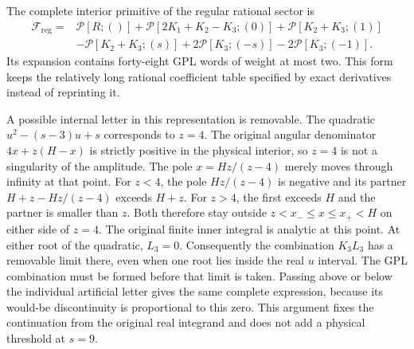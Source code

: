 The complete interior primitive of the regular rational sector is
\begin{align}
 \mathcal F_{\mathrm{reg}}={}&\mathcal P[R;()]
 +\mathcal P[2K_1+K_2-K_3;(0)]
 +\mathcal P[K_2+K_3;(1)]\\
 &-\mathcal P[K_2+K_3;(s)]
 +2\mathcal P[K_3;(-s)]-2\mathcal P[K_3;(-1)].
 \label{eq:comp-real-rational-primitive}
\end{align}
Its expansion contains forty-eight GPL words of weight at most two.
This form keeps the relatively long rational coefficient table
specified by exact derivatives instead of reprinting it.

A possible internal letter in this representation is removable.
The quadratic $u^2-(s-3)u+s$ corresponds to $z=4$. The original
angular denominator $4x+z(H-x)$ is strictly positive in the physical
interior, so $z=4$ is not a singularity of the amplitude. The pole
$x=Hz/(z-4)$ merely moves through infinity at that point.
For $z<4$, the pole $Hz/(z-4)$ is negative and its partner
$H+z-Hz/(z-4)$ exceeds $H+z$. For $z>4$, the first exceeds
$H$ and the partner is smaller than $z$. Both therefore stay outside
$z<x_-\leq x\leq x_+<H$ on either side of $z=4$.
The original finite inner integral is analytic at this point.
At either root of the quadratic, $L_3=0$. Consequently the
combination $K_3L_3$ has a removable limit there, even when one root
lies inside the real $u$ interval. The GPL combination must be
formed before that limit is taken. Passing above or below the
individual artificial letter gives the same complete expression,
because its would-be discontinuity is proportional to this zero.
This argument fixes the continuation from the original real
integrand and does not add a physical threshold at $s=9$.

